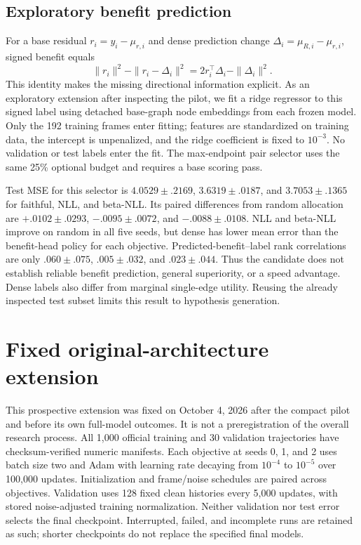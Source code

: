 \subsection{Exploratory benefit prediction}
For a base residual $r_i=y_i-\mu_{r,i}$ and dense prediction change $\Delta_i=\mu_{R,i}-\mu_{r,i}$, signed benefit equals
\begin{equation}
 \|r_i\|^2-\|r_i-\Delta_i\|^2
 =2r_i^\top\Delta_i-\|\Delta_i\|^2.
\end{equation}
This identity makes the missing directional information explicit. As an exploratory extension after inspecting the pilot, we fit a ridge regressor to this signed label using detached base-graph node embeddings from each frozen model. Only the 192 training frames enter fitting; features are standardized on training data, the intercept is unpenalized, and the ridge coefficient is fixed to $10^{-3}$. No validation or test labels enter the fit. The max-endpoint pair selector uses the same 25\% optional budget and requires a base scoring pass.

Test MSE for this selector is $4.0529\pm.2169$, $3.6319\pm.0187$, and $3.7053\pm.1365$ for faithful, NLL, and beta-NLL. Its paired differences from random allocation are $+.0102\pm.0293$, $-.0095\pm.0072$, and $-.0088\pm.0108$. NLL and beta-NLL improve on random in all five seeds, but dense has lower mean error than the benefit-head policy for each objective. Predicted-benefit--label rank correlations are only $.060\pm.075$, $.005\pm.032$, and $.023\pm.044$. Thus the candidate does not establish reliable benefit prediction, general superiority, or a speed advantage. Dense labels also differ from marginal single-edge utility. Reusing the already inspected test subset limits this result to hypothesis generation.




\section{Fixed original-architecture extension}
\label{sec:full-protocol}
This prospective extension was fixed on October 4, 2026 after the compact pilot
and before its own full-model outcomes. It is not a preregistration of the
overall research process. All 1,000 official training and 30 validation
trajectories have checksum-verified numeric manifests. Each objective at seeds
0, 1, and 2 uses batch size two and Adam with learning rate decaying from
$10^{-4}$ to $10^{-5}$ over 100,000 updates. Initialization and frame/noise
schedules are paired across objectives. Validation uses 128 fixed clean
histories every 5,000 updates, with stored noise-adjusted training normalization.
Neither validation nor test error selects the final checkpoint. Interrupted,
failed, and incomplete runs are retained as such; shorter checkpoints do not
replace the specified final models.


